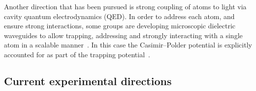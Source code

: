     Another direction that has been pursued is strong coupling of atoms to light via cavity 
    quantum electrodynamics (QED).  
    In order to address each atom, and ensure strong interactions, some groups 
    are developing microscopic dielectric waveguides to allow trapping, addressing and strongly interacting with a 
    single atom in a scalable manner~\cite{Alton2011, Hung2013, Goban2014}.  In this case
    the Casimir--Polder potential is explicitly accounted for as part of the trapping potential~\cite{Goban2014}.
    

\subsection{Current experimental directions}



